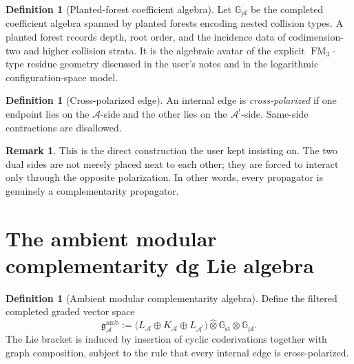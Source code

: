 \documentclass[11pt,oneside]{memoir}
\numberwithin{equation}{chapter}
\theoremstyle{definition}
\newtheorem{definition}[theorem]{Definition}
\newtheorem{remark}[theorem]{Remark}
\newcommand{\cA}{\mathcal A}
\newcommand{\fg}{\mathfrak g}
\newcommand{\hot}{\widehat\otimes}
\DeclareMathOperator{\FM}{FM}
\begin{document}
\begin{definition}[Planted-forest coefficient algebra]
\label{def:planted-forest-coefficients}
Let \(\mathbb G_{\mathrm{pf}}\) be the completed coefficient algebra spanned by planted forests encoding nested collision types.  A planted forest records depth, root order, and the incidence data of codimension-two and higher collision strata.  It is the algebraic avatar of the explicit \(\FM_3\)-type residue geometry discussed in the user's notes and in the logarithmic configuration-space model.
\end{definition}

\begin{definition}[Cross-polarized edge]
\label{def:cross-polarized-edge}
An internal edge is \emph{cross-polarized} if one endpoint lies on the \(\cA\)-side and the other lies on the \(\cA^!\)-side.  Same-side contractions are disallowed.
\end{definition}

\begin{remark}
This is the direct construction the user kept insisting on.  The two dual sides are not merely placed next to each other; they are forced to interact only through the opposite polarization.  In other words, every propagator is genuinely a complementarity propagator.
\end{remark}

\section{The ambient modular complementarity dg Lie algebra}

\begin{definition}[Ambient modular complementarity algebra]
\label{def:ambient-modular-complementarity-algebra}
Define the filtered completed graded vector space
\begin{equation}
\label{eq:ambient-modular-complementarity-algebra}
\fg^{\mathrm{amb}}_{\cA}
:=
\bigl(L_{\cA}\oplus K_{\cA}\oplus L_{\cA^!}\bigr)
\hot \mathbb G_{\mathrm{st}}
\hot \mathbb G_{\mathrm{pf}}.
\end{equation}
The Lie bracket is induced by insertion of cyclic coderivations together with graph composition, subject to the rule that every internal edge is cross-polarized.
\end{definition}
\end{document}
